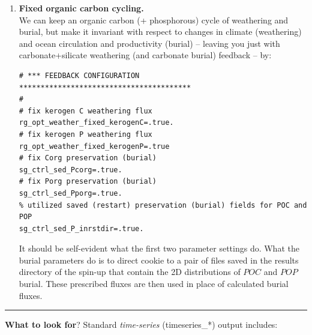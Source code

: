 \begin{enumerate}[noitemsep]
\newpage

\item \textbf{Fixed organic carbon cycling.}
\vspace{1mm}
\\We can keep an organic carbon (+ phosphorous) cycle of weathering and burial, but make it invariant with respect to changes in climate (weathering) and ocean circulation and productivity (burial) -- leaving you just with carbonate+silicate weathering (and carbonate burial) feedback -- by:
\vspace{-1mm}\small\begin{verbatim}
# *** FEEDBACK CONFIGURATION ****************************************
#
# fix kerogen C weathering flux
rg_opt_weather_fixed_kerogenC=.true.
# fix kerogen P weathering flux
rg_opt_weather_fixed_kerogenP=.true
# fix Corg preservation (burial)
sg_ctrl_sed_Pcorg=.true.
# fix Porg preservation (burial)
sg_ctrl_sed_Pporg=.true.
% utilized saved (restart) preservation (burial) fields for POC and POP
sg_ctrl_sed_P_inrstdir=.true.
\end{verbatim}\normalsize\vspace{-1mm}
It should be self-evident what the first two parameter settings do. What the burial parameters do is to direct cookie to a pair of files saved in the \textsf{\footnotesize results} directory of the spin-up that contain the 2D distributions of $POC$ and $POP$ burial. These prescribed fluxes are then used in place of calculated burial fluxes.

\end{enumerate}

\vspace{1mm}\noindent\rule{4cm}{0.1mm}\vspace{2mm}

\noindent \textbf{What to look for}? Standard \textit{time-series} (\textsf{\footnotesize timeseries\_*}) output includes:

